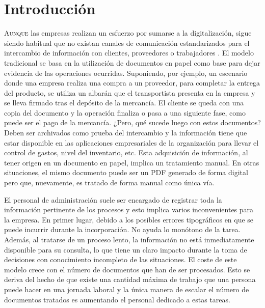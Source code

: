 
\chapter{Introducción}
\label{chap:introduccion}

\lettrine{A}{unque} las empresas realizan un esfuerzo por sumarse a la digitalización, sigue siendo habitual que no existan canales de comunicación estandarizados para el intercambio de información con clientes, proveedores o trabajadores \cite{moncloa_announcement_inversionGobierno}. El modelo tradicional se basa en la utilización de documentos en papel como base para dejar evidencia de las operaciones ocurridas. Suponiendo, por ejemplo, un escenario donde una empresa realiza una compra a un proveedor, para completar la entrega del producto, se utiliza un albarán que el transportista presenta en la empresa y se lleva firmado tras el depósito de la mercancía. El cliente se queda con una copia del documento y la operación finaliza o pasa a una siguiente fase, como puede ser el pago de la mercancía. ¿Pero, qué sucede luego con estos documentos? Deben ser archivados como prueba del intercambio y la información tiene que estar disponible en las aplicaciones empresariales de la organización para llevar el control de gastos, nivel del inventario, etc. Esta adquisición de información, al tener origen en un documento en papel, implica un tratamiento manual. En otras situaciones, el mismo documento puede ser un PDF generado de forma digital pero que, nuevamente, es tratado de forma manual como única vía.

El personal de administración suele ser encargado de registrar toda la información pertinente de los procesos y esto implica varios inconvenientes para la empresa. En primer lugar, debido a los posibles errores tipográficos en que se puede incurrir durante la incorporación. No ayuda lo monótono de la tarea. Además, al tratarse de un proceso lento, la información no está inmediatamente disponible para su consulta, lo que tiene un claro impacto durante la toma de decisiones con conocimiento incompleto de las situaciones. El coste de este modelo crece con el número de documentos que han de ser procesados. Esto se deriva del hecho de que existe una cantidad máxima de trabajo que una persona puede hacer en una jornada laboral y la única manera de escalar el número de documentos tratados es aumentando el personal dedicado a estas tareas.


